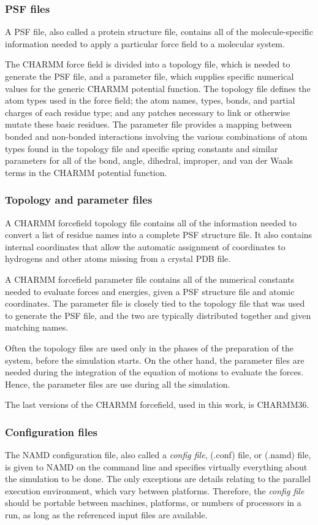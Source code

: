 \subsubsection{PSF files}
A PSF file, also called a protein structure file, contains all of the molecule-specific information needed to apply a particular force field to a molecular system. 

The CHARMM force field is divided into a topology file, which is needed to generate the PSF file, and a parameter file, which supplies specific numerical values for the generic CHARMM potential function. The topology file defines the atom types used in the force field; the atom names, types, bonds, and partial charges of each residue type; and any patches necessary to link or otherwise mutate these basic residues. The parameter file provides a mapping between bonded and non-bonded interactions involving the various combinations of atom types found in the topology file and specific spring constants and similar parameters for all of the bond, angle, dihedral, improper, and van der Waals terms in the CHARMM potential function.

\subsubsection{Topology and parameter files}
A CHARMM forcefield topology file contains all of the information needed to convert a list of residue names into a complete PSF structure file. It also contains internal coordinates that allow the automatic assignment of coordinates to hydrogens and other atoms missing from a crystal PDB file.

A CHARMM forcefield parameter file contains all of the numerical constants needed to evaluate forces and energies, given a PSF structure file and atomic coordinates. The parameter file is closely tied to the topology file that was used to generate the PSF file, and the two are typically distributed together and given matching names.

Often the topology files are used only in the phases of the preparation of the system, before the simulation starts. On the other hand, the parameter files are needed during the integration of the equation of motions to evaluate the forces. Hence, the parameter files are use during all the simulation.

The last versions of the CHARMM forcefield, used in this work, is CHARMM36.

\subsubsection{Configuration files}
The NAMD configuration file, also called a \textit{config file}, (.conf) file, or (.namd) file, is given to NAMD on the command line and specifies virtually everything about the simulation to be done. The only exceptions are details relating to the parallel execution environment, which vary between platforms. Therefore, the \textit{config file} should be portable between machines, platforms, or numbers of processors in a run, as long as the referenced input files are available.



